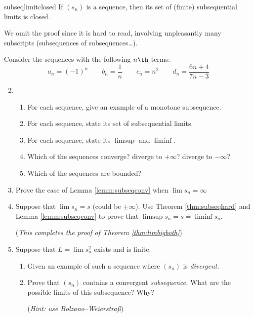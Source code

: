 \begin{thm}{}{subseqlimitclosed}
If $(s_n)$ is a sequence, then its set of (finite) subsequential limits is closed.
\end{thm}

We omit the proof since it is hard to read, involving unpleasantly many subscripts (subsequences of subsequences\ldots). %


\goodbreak


\begin{exercisessec}{}{}
	\exstart %
	Consider the sequences with the following $n\th$ terms:
	\[a_n=(-1)^n\qquad b_n=\frac 1n\qquad c_n=n^2\qquad d_n=\frac{6n+4}{7n-3}\]
	\begin{enumerate}\setcounter{enumi}{1}  
	  \item[]\begin{enumerate}
		  \item For each sequence, give an example of a monotone subsequence.
		  \item For each sequence, state its set of subsequential limits.
		  \item For each sequence, state its $\limsup$ and $\liminf$.
		  \item Which of the sequences converge? diverge to $+\infty$? diverge to $-\infty$?
		  \item Which of the sequences are bounded?
	  \end{enumerate}
  
  
  	\item Prove the case of Lemma \ref{lemm:subseqconv} when $\lim s_n=\infty$
  

		\item\label{exs:liminfsuplim} Suppose that $\lim s_n=s$ (could be $\pm \infty$). Use Theorem \ref{thm:subseqhard} and Lemma \ref{lemm:subseqconv} to prove that $\limsup s_n=s=\liminf s_n$.\par
		(\emph{This completes the proof of Theorem \ref{thm:limbigboth}})
	
  
		\item Suppose that $L=\lim s_n^2$ exists and is finite.
		\begin{enumerate}
		  \item Given an example of such a sequence where $(s_n)$ is \emph{divergent.}
		  \item Prove that $(s_n)$ contains a convergent \emph{subsequence.} What are the possible limits of this subsequence? Why?\par
		(\emph{Hint: use Bolzano--Weierstraß})
		\end{enumerate}
		

\end{enumerate}
\end{exercisessec}
